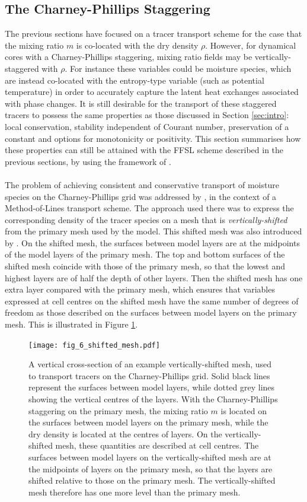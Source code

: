 \documentclass[11pt,a4paper]{article}
\begin{document}
\subsection{The Charney-Phillips Staggering} \label{sec:charney-phillips}
The previous sections have focused on a tracer transport scheme for the case that the mixing ratio $m$ is co-located with the dry density $\rho$.
However, for dynamical cores with a Charney-Phillips staggering, mixing ratio fields may be vertically-staggered with $\rho$.
For instance these variables could be moisture species, which are instead co-located with the entropy-type variable (such as potential temperature) in order to accurately capture the latent heat exchanges associated with phase changes.
It is still desirable for the transport of these staggered tracers to possess the same properties as those discussed in Section \ref{sec:intro}: local conservation, stability independent of Courant number, preservation of a constant and options for monotonicity or positivity.
This section summarises how these properties can still be attained with the FFSL scheme described in the previous sections, by using the framework of \citet{bendall2023solution}.
\\
\\
The problem of achieving consistent and conservative transport of moisture species on the Charney-Phillips grid was addressed by \citet{bendall2023solution}, in the context of a Method-of-Lines transport scheme.
The approach used there was to express the corresponding density of the tracer species on a mesh that is \textit{vertically-shifted} from the primary mesh used by the model.
This shifted mesh was also introduced by \citet{thuburn2022numerical}.
On the shifted mesh, the surfaces between model layers are at the midpoints of the model layers of the primary mesh.
The top and bottom surfaces of the shifted mesh coincide with those of the primary mesh, so that the lowest and highest layers are of half the depth of other layers.
Then the shifted mesh has one extra layer compared with the primary mesh, which ensures that variables expressed at cell centres on the shifted mesh have the same number of degrees of freedom as those described on the surfaces between model layers on the primary mesh.
This is illustrated in Figure \ref{fig:shifted}.
\begin{figure}[h!] 
\centering
\texttt{[image: fig\_6\_shifted\_mesh.pdf]}
\caption{A vertical cross-section of an example vertically-shifted mesh, used to transport tracers on the Charney-Phillips grid.
Solid black lines represent the surfaces between model layers, while dotted grey lines showing the vertical centres of the layers.
With the Charney-Phillips staggering on the primary mesh, the mixing ratio $m$ is located on the surfaces between model layers on the primary mesh, while the dry density is located at the centres of layers.
On the vertically-shifted mesh, these quantities are described at cell centres.
The surfaces between model layers on the vertically-shifted mesh are at the midpoints of layers on the primary mesh, so that the layers are shifted relative to those on the primary mesh.
The vertically-shifted mesh therefore has one more level than the primary mesh.
} \label{fig:shifted}
\end{figure}
\end{document}
